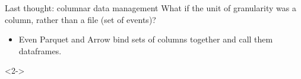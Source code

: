 \documentclass[aspectratio=169]{beamer}
\begin{document}
\begin{frame}{Last thought: columnar data management}
\vspace{0.5 cm}
What if the unit of granularity was a column, rather than a file (set of events)?
\begin{itemize}
\item Even Parquet and Arrow bind sets of columns together and call them dataframes.
\end{itemize}

\begin{uncoverenv}<2->
\begin{center}

\end{center}
\end{uncoverenv}
\end{frame}
\end{document}
